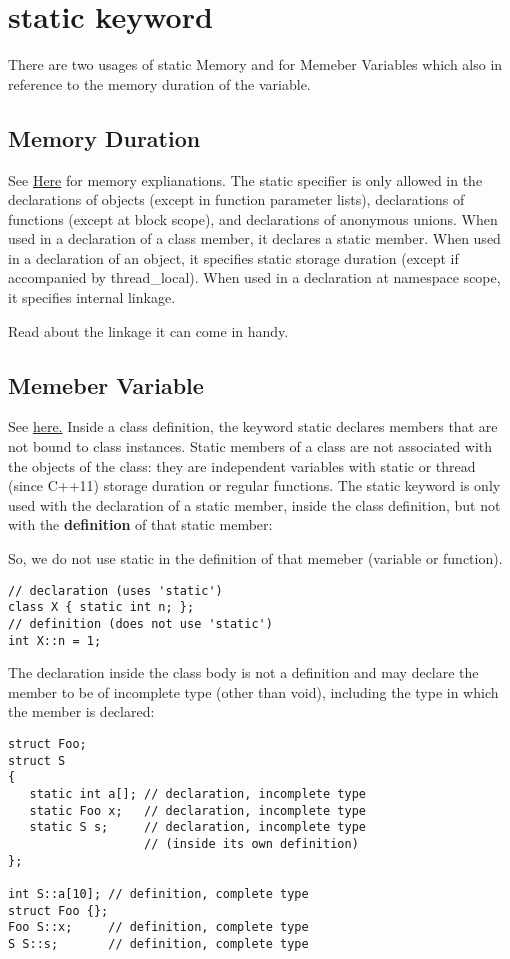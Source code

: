 \documentclass[11pt,twoside,a4paper]{report}
\begin{document}
\section{static keyword}
There are two usages of static Memory and for Memeber Variables which also in reference to the memory duration of the variable.
\subsection{Memory Duration}
See \href{https://en.cppreference.com/w/cpp/language/storage_duration}{Here} for memory explianations.
The static specifier is only allowed in the declarations of objects (except in function parameter lists), declarations of functions (except at block scope), 
and declarations of anonymous unions. When used in a declaration of a class member, it declares a static member.
When used in a declaration of an object, it specifies static storage duration (except if accompanied by thread\_local).
When used in a declaration at namespace scope, it specifies internal linkage.

Read about the linkage it can come in handy.
\subsection{Memeber Variable}
See \href{https://en.cppreference.com/w/cpp/language/static}{here.}
Inside a class definition, the keyword static declares members that are not bound to class instances.
Static members of a class are not associated with the objects of the class: they are independent variables
with static or thread (since C++11) storage duration or regular functions. The static keyword is only used 
with the declaration of a static member, inside the class definition, but not with the \textbf{definition} of that static member: 

So, we do not use static in the definition of that memeber (variable or function).

\begin{lstlisting}
// declaration (uses 'static')
class X { static int n; };
// definition (does not use 'static')
int X::n = 1;              
\end{lstlisting}

The declaration inside the class body is not a definition and may declare the member to be of incomplete type (other than void), including the type in which the member is declared: 
\begin{lstlisting}
struct Foo;
struct S
{
   static int a[]; // declaration, incomplete type
   static Foo x;   // declaration, incomplete type
   static S s;     // declaration, incomplete type
                   // (inside its own definition)
};
 
int S::a[10]; // definition, complete type
struct Foo {};
Foo S::x;     // definition, complete type
S S::s;       // definition, complete type
\end{lstlisting}
\end{document}
